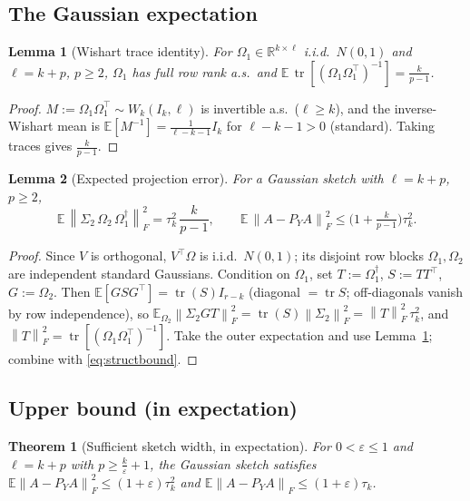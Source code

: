 \documentclass{amsart}
\newtheorem{theorem}{Theorem}
\newtheorem{lemma}{Lemma}
\theoremstyle{definition}
\DeclareMathOperator{\tr}{tr}
\newcommand{\R}{\mathbb{R}}
\newcommand{\Frob}[1]{\left\lVert #1\right\rVert_F}
\newcommand{\E}{\mathbb{E}}
\begin{document}
\subsection{The Gaussian expectation}

\begin{lemma}[Wishart trace identity]\label{lem:wishart}
For $\Omega_1\in\R^{k\times\ell}$ i.i.d.\ $N(0,1)$ and $\ell=k+p$, $p\ge2$,
$\Omega_1$ has full row rank a.s.\ and
$\E\,\tr[(\Omega_1\Omega_1^\top)^{-1}]=\frac{k}{p-1}$.
\end{lemma}

\begin{proof}
$M:=\Omega_1\Omega_1^\top\sim W_k(I_k,\ell)$ is invertible a.s.\ ($\ell\ge k$),
and the inverse-Wishart mean is $\E[M^{-1}]=\frac{1}{\ell-k-1}I_k$ for
$\ell-k-1>0$ (standard). Taking traces gives $\frac{k}{p-1}$.
\end{proof}

\begin{lemma}[Expected projection error]\label{lem:gauss}
For a Gaussian sketch with $\ell=k+p$, $p\ge2$,
\begin{equation}\label{eq:gaussexp}
\E\,\Frob{\Sigma_2\,\Omega_2\,\Omega_1^{\dagger}}^2=\tau_k^2\,\frac{k}{p-1},
\qquad
\E\,\Frob{A-P_Y A}^2\le\Big(1+\tfrac{k}{p-1}\Big)\tau_k^2 .
\end{equation}
\end{lemma}

\begin{proof}
Since $V$ is orthogonal, $V^\top\Omega$ is i.i.d.\ $N(0,1)$; its disjoint row
blocks $\Omega_1,\Omega_2$ are independent standard Gaussians. Condition on
$\Omega_1$, set $T:=\Omega_1^{\dagger}$, $S:=TT^\top$, $G:=\Omega_2$. Then
$\E[GSG^\top]=\tr(S)I_{r-k}$ (diagonal $=\tr S$; off-diagonals vanish by
row independence), so
$\E_{\Omega_2}\Frob{\Sigma_2 GT}^2=\tr(S)\Frob{\Sigma_2}^2
=\Frob{T}^2\,\tau_k^2$, and $\Frob{T}^2=\tr[(\Omega_1\Omega_1^\top)^{-1}]$.
Take the outer expectation and use Lemma~\ref{lem:wishart}; combine with
\eqref{eq:structbound}.
\end{proof}

\subsection{Upper bound (in expectation)}

\begin{theorem}[Sufficient sketch width, in expectation]\label{thm:upper}
For $0<\varepsilon\le1$ and $\ell=k+p$ with $p\ge\frac{k}{\varepsilon}+1$, the
Gaussian sketch satisfies
$\E\Frob{A-P_YA}^2\le(1+\varepsilon)\tau_k^2$ and
$\E\Frob{A-P_YA}\le(1+\varepsilon)\tau_k$.
\end{theorem}
\end{document}
